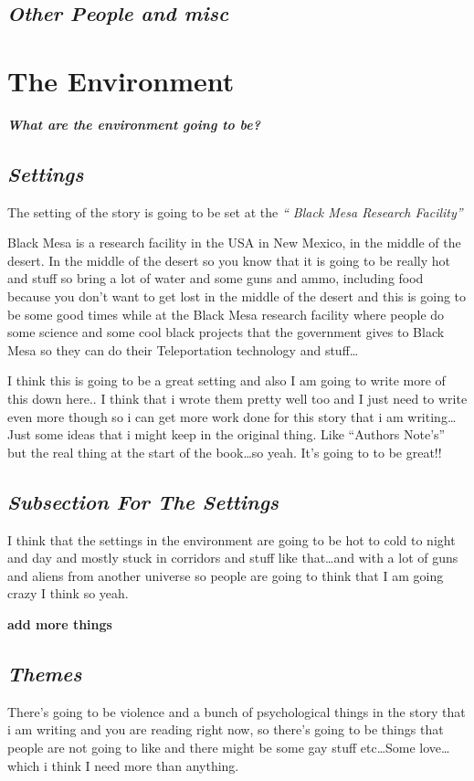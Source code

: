 \documentclass[14pt,letterpaper]{book}
\begin{document}
\subsection{\textit{Other People and misc}}
\section{The Environment}
\textbf{\textit{What are the environment going to be?}}
\subsection{\textit{Settings}}

The setting of the story is going to be set at the \textit{`` Black Mesa Research Facility''}


Black Mesa is a research facility in the USA in New Mexico, in the middle of the desert. In the middle of the desert so you know that it is going to be really hot and stuff so bring a lot of water and some guns and ammo, including food because you don't want to get lost in the middle of the desert and this is going to be some good times while at the Black Mesa research facility where people do some science and some cool black projects that the government gives to Black Mesa so they can do their Teleportation technology and stuff\ldots 

I think this is going to be a great setting and also I am going to write more of this down here.. I think that i wrote them pretty well too and I just need to write even more though so i can get more work done for this story that i am writing\ldots Just some ideas that i might keep in the original thing. Like ``Authors Note's'' but the real thing at the start of the book\ldots so yeah. It's going to to be great!!
\subsection{\textit{Subsection For The Settings}}

I think that the settings in the environment are going to be hot to cold to night and day and mostly stuck in corridors and stuff like that\ldots and with a lot of guns and aliens from another universe so people are going to think that I am going crazy I think so yeah.

\textbf{add more things}
\subsection{\textit{Themes}}
There's going to be violence and a bunch of psychological things in the story that i am writing and you are reading right now, so there's going to be things that people are not  going to like and there might be some gay stuff etc\ldots Some love\ldots which i think I need more than anything.
\\
\tableofcontents
\end{document}
